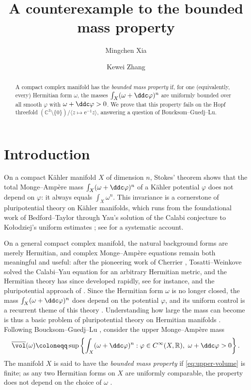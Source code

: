\documentclass[11pt,a4paper]{article}
\title{A counterexample to the bounded mass property}
\author{Mingchen Xia \and Kewei Zhang}
\date{}
\begin{document}
	
	\maketitle
	
	\begin{abstract}
		A compact complex manifold has the \emph{bounded mass property} if,
		for one (equivalently, every) Hermitian form $\omega$, the masses
		$\int_X(\omega+\ddc\varphi)^n$ are uniformly bounded over all smooth
		$\varphi$ with $\omega+\ddc\varphi>0$.  We prove
		that this property fails on the Hopf threefold
		$(\mathbb C^3\setminus\{0\})/\langle z\mapsto\mathrm{e}^{-1}z\rangle$,
		answering a question of Boucksom--Guedj--Lu.
	\end{abstract}
	
	\section{Introduction}
	
	On a compact K\"ahler manifold $X$ of dimension $n$, Stokes' theorem
	shows that the total Monge--Amp\`ere mass
	$\int_X(\omega+\ddc\varphi)^n$ of a K\"ahler potential $\varphi$ does
	not depend on $\varphi$: it always equals $\int_X\omega^n$.  This
	invariance is a cornerstone of pluripotential theory on K\"ahler
	manifolds, which runs from the foundational work of Bedford--Taylor
	\cite{BT82} through Yau's solution \cite{Y78} of the Calabi
	conjecture \cite{Cal57} to Ko\l odziej's uniform estimates
	\cite{Kol98}; see \cite{GZ17} for a systematic account.
	
	On a general compact complex manifold, the natural background forms
	are merely Hermitian, and complex Monge--Amp\`ere equations remain
	both meaningful and useful: after the pioneering work of Cherrier
	\cite{Che87}, Tosatti--Weinkove \cite{TW10} solved the Calabi--Yau
	equation for an arbitrary Hermitian metric, and the Hermitian theory
	has since developed rapidly, see for instance,
	\cite{DK12,KN15,STW17} and the pluripotential approach of
	\cite{GL21,GL23}.  Since the Hermitian form $\omega$ is no longer
	closed, the mass $\int_X(\omega+\ddc\varphi)^n$ does depend
	on the potential $\varphi$, and its uniform control is a recurrent
	theme of this theory \cite{Chi14,DK12,KN15,GL23}.  Understanding how
	large the mass can become is thus a basic problem of pluripotential
	theory on Hermitian manifolds \cite{GL22}.  Following
	Boucksom--Guedj--Lu \cite[Definition 1.16]{BGL}, consider the upper
	Monge--Amp\`ere mass
	\begin{equation}
		\overline{\vol}(\omega)
		\coloneqq \sup\left\{
		\int_X(\omega+\ddc\varphi)^n:
		\varphi\in C^\infty(X,\mathbb R),\ \omega+\ddc\varphi>0
		\right\}.
		\label{eq:upper-volume}
	\end{equation}
	The manifold $X$ is said to have the \emph{bounded mass property} if
	\eqref{eq:upper-volume} is finite; as any two Hermitian forms on $X$
	are uniformly comparable, the property does not depend on the choice of
	$\omega$ \cite[\S1.5]{BGL}.
	
\end{document}

